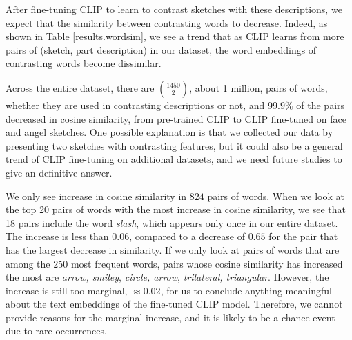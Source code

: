 After fine-tuning CLIP to learn to contrast sketches with these descriptions, we expect that the similarity between contrasting words to decrease. Indeed, as shown in Table \ref{results.wordsim}, we see a trend that as CLIP learns from more pairs of (sketch, part description) in our dataset, the word embeddings of contrasting words become dissimilar.  

Across the entire dataset, there are $\binom{1450}{2}$, about 1 million, pairs of words, whether they are used in contrasting descriptions or not, and $99.9\%$ of the pairs decreased in cosine similarity, from pre-trained CLIP to CLIP fine-tuned on face and angel sketches. One possible explanation is that we collected our data by presenting two sketches with contrasting features, but it could also be a general trend of CLIP fine-tuning on additional datasets, and we need future studies to give an definitive answer.

We only see increase in cosine similarity in $824$ pairs of words. When we look at the top 20 pairs of words with the most increase in cosine similarity, we see that 18 pairs include the word \textit{slash}, which appears only once in our entire dataset. The increase is less than $0.06$, compared to a decrease of $0.65$ for the pair that has the largest decrease in similarity. If we only look at pairs of words that are among the 250 most frequent words, pairs whose cosine similarity has increased the most are \textit{arrow, smiley}, \textit{circle, arrow}, \textit{trilateral, triangular}. However, the increase is still too marginal, $\approx 0.02$, for us to conclude anything meaningful about the text embeddings of the fine-tuned CLIP model. 
Therefore, we cannot provide reasons for the marginal increase, and it is likely to be a chance event due to rare occurrences.   
 

        





